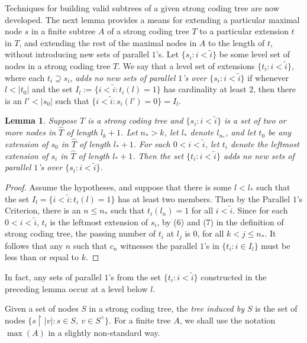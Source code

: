 \documentclass{amsart}
\newtheorem{lem}[thm]{Lemma}
\theoremstyle{remark}
\theoremstyle{definition}
\theoremstyle{remark}
\newcommand{\contains}{\supseteq}
\newcommand{\re}{\restriction}
\newcommand{\POC}{Parallel $1$'s Criterion}
\begin{document}
Techniques  for building valid subtrees of a given strong coding tree  are now developed.
The next lemma provides a means  for
extending a
particular maximal  node $s$ in a finite
subtree $A$ of a strong coding tree $T$
to a particular extension $t$ in $T$,
and extending the rest of the maximal nodes in $A$ to the length of $t$, without introducing new sets of parallel $1$'s.
Let $\{s_i:i<\tilde{i}\}$ be some level set of nodes in a strong coding tree $T$.
We say that a level set of extensions $\{t_i:i<\tilde{i}\}$,
where each $t_i\contains s_i$,
 {\em  adds no new sets of parallel $1$'s over $\{s_i:i<\tilde{i}\}$}
if  whenever $l<|t_0|$ and the
 set
 $I_l:=\{i<\tilde{i}:t_i(l)=1\}$ has  cardinality at least $2$,
then there is an  $l'<|s_0|$ such that
$\{i<\tilde{i}:s_i(l')=0\}=I_l$.




\begin{lem}\label{lem.poc}
Suppose $T$ is a strong coding tree and $\{s_i:i<\tilde{i}\}$   is a set of two or more   nodes in $\widehat{T}$ of length $l_k+1$.
Let
 $n_*>k$,  let $l_*$ denote $l_{n_*}$,
and
 let $t_0$ be any extension of $s_0$ in $\widehat{T}$ of length $l_*+1$.
 For each $0<i<\tilde{i}$, let $t_i$ denote the leftmost extension of $s_i$ in $\widehat{T}$ of length $l_*+1$.
Then
the set $\{t_i:i<\tilde{i}\}$ adds no new sets of parallel $1$'s over $\{s_i:i<\tilde{i}\}$.
\end{lem}



\begin{proof}
Assume the hypotheses, and
suppose  that  there is some
 $l<l_*$ such that
the set $I_l=\{i<\tilde{i}:t_i(l)=1\}$ has at least two members.
Then by  the \POC,
there is an $n\le n_*$ such that
$t_i(l_n)=1$ for all $i<\tilde{i}$.
Since for each $0<i<\tilde{i}$,  $t_i$ is the leftmost extension of $s_i$,
by (6) and (7) in the definition of strong coding tree,
the passing number of $t_i$ at $l_j$ is $0$,
for all $k<j\le n_*$.
It follows that  any $n$ such that $c_n$ witnesses the parallel $1$'s in $\{t_i:i\in I_l\}$ must be less than or equal to $k$.
\end{proof}


In fact, any sets of parallel $1$'s from the set $\{t_i:i<\tilde{i}\}$ constructed in the preceding lemma occur at a level below $l$.


Given a set of nodes $S$ in a strong coding tree,
the {\em tree induced by $S$}
is  the set of nodes
$\{s\re |v|:s\in S,\ v\in S^{\wedge}\}$.
For a finite tree $A$, we shall use the notation $\max(A)$ in a slightly non-standard way.
\end{document}
